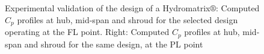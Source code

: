  

\begin{figure}[h!]
\begin{minipage}[b]{0.5\linewidth}
 \centering
\end{minipage}
\begin{minipage}[b]{0.5\linewidth}
 \centering
\end{minipage}

\caption{Experimental validation of the design of a Hydromatrix$\circledR$: Computed $C_p$ profiles at hub, mid-span and shroud for the selected design operating at the FL point.  Right: Computed $C_p$ profiles at hub, mid-span and shroud for the same design, at the PL point}
\label{exp.PL.FL}
\end{figure}

